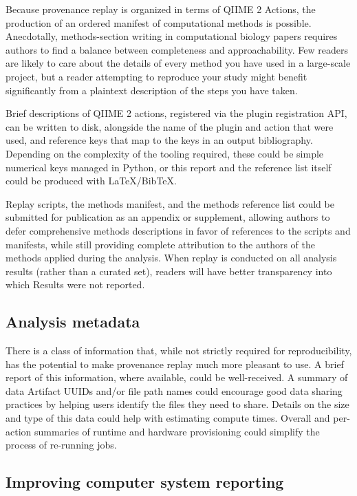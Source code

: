 Because provenance replay is organized in terms of QIIME 2 Actions, the
production of an ordered manifest of computational methods is possible.
Anecdotally, methods-section writing in computational biology papers requires
authors to find a balance between completeness and approachability. Few readers
are likely to care about the details of every method you have used in a
large-scale project, but a reader attempting to reproduce your study might
benefit significantly from a plaintext description of the steps you have taken.

Brief descriptions of QIIME 2 actions, registered via the plugin registration
API, can be written to disk, alongside the name of the plugin and action that
were used, and reference keys that map to the keys in an output bibliography.
Depending on the complexity of the tooling required, these could be simple
numerical keys managed in Python, or this report and the reference list itself
could be produced with LaTeX/BibTeX.

Replay scripts, the methods manifest, and the methods reference list could be
submitted for publication as an appendix or supplement, allowing authors to
defer comprehensive methods descriptions in favor of references to the scripts
and manifests, while still providing complete attribution to the authors of the
methods applied during the analysis. When replay is conducted on all analysis
results (rather than a curated set), readers will have better transparency into
which Results were not reported.

\subsection{Analysis metadata \parencite[Issue 76]{keefe_issues_2021}}

There is a class of information that, while not strictly required for
reproducibility, has the potential to make provenance replay much more pleasant
to use. A brief report of this information, where available, could be
well-received. A summary of data Artifact UUIDs and/or file path names could
encourage good data sharing practices by helping users identify the files they
need to share. Details on the size and type of this data could help with
estimating compute times. Overall and per-action summaries of runtime and
hardware provisioning could simplify the process of re-running jobs.

\subsection{Improving computer system reporting \parencite[Issue 77]{keefe_issues_2021}}
\label{comp_env_reporting}

